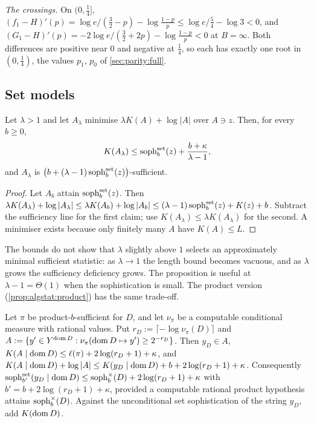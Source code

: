 \emph{The crossings.} On $(0,\frac14]$, $(f_1-H)'(p)=\log e/(\frac32-p)-\log\frac{1-p}p\le\log e/\frac54-\log3<0$, and $(G_1-H)'(p)=-2\log e/(\frac32+2p)-\log\frac{1-p}p<0$ at $B=\infty$. Both differences are positive near $0$ and negative at $\frac14$, so each has exactly one root in $(0,\frac14)$, the values $p_1$, $p_0$ of \cref{sec:parity:full}.

\subsection{Set models}\label{app:algstat:coarse}

\begin{proposition}\label{prop:algstat:set}
Let $\lambda>1$ and let $A_\lambda$ minimise $\lambda K(A)+\log|A|$ over $A\ni z$. Then, for every $b\ge0$,
\[
K(A_\lambda)\le\operatorname{soph}^{\mathrm{set}}_b(z)+\frac{b+\kappa}{\lambda-1},
\]
and $A_\lambda$ is $\big(b+(\lambda-1)\operatorname{soph}^{\mathrm{set}}_b(z)\big)$-sufficient.
\end{proposition}

\begin{proof}
Let $A_b$ attain $\operatorname{soph}^{\mathrm{set}}_b(z)$. Then $\lambda K(A_\lambda)+\log|A_\lambda|\le\lambda K(A_b)+\log|A_b|\le(\lambda-1)\operatorname{soph}^{\mathrm{set}}_b(z)+K(z)+b$. Subtract the sufficiency line for the first claim; use $K(A_\lambda)\le\lambda K(A_\lambda)$ for the second. A minimiser exists because only finitely many $A$ have $K(A)\le L$.
\end{proof}

\begin{remark}\label{rem:algstat:near1}
The bounds do not show that $\lambda$ slightly above $1$ selects an approximately minimal sufficient statistic: as $\lambda\to1$ the length bound becomes vacuous, and as $\lambda$ grows the sufficiency deficiency grows. The proposition is useful at $\lambda-1=\Theta(1)$ when the sophistication is small. The product version (\cref{prop:algstat:product}) has the same trade-off.
\end{remark}

\begin{proposition}\label{prop:algstat:coarse}
Let $\pi$ be product-$b$-sufficient for $D$, and let $\nu_\pi$ be a computable conditional measure with rational values. Put $r_D:=\lceil-\log\nu_\pi(D)\rceil$ and $A:=\{y'\in Y^{\operatorname{dom} D}:\nu_\pi(\operatorname{dom} D\mapsto y')\ge2^{-r_D}\}$. Then $y_D\in A$, $K(A\mid\operatorname{dom} D)\le\ell(\pi)+2\log(r_D+1)+\kappa$, and $K(A\mid\operatorname{dom} D)+\log|A|\le K(y_D\mid\operatorname{dom} D)+b+2\log(r_D+1)+\kappa$. Consequently $\operatorname{soph}^{\mathrm{set}}_{b'}(y_D\mid\operatorname{dom} D)\le\operatorname{soph}^{\times}_b(D)+2\log(r_D+1)+\kappa$ with $b'=b+2\log(r_D+1)+\kappa$, provided a computable rational product hypothesis attains $\operatorname{soph}^{\times}_b(D)$. Against the unconditional set sophistication of the string $y_D$, add $K(\operatorname{dom} D)$.
\end{proposition}


